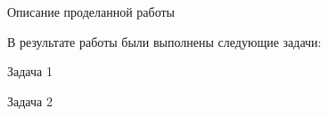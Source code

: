 \Conclusion %

Описание проделанной работы

В результате работы были выполнены следующие задачи:
\begin{compactlist}
  \item Задача 1
  \item Задача 2
\end{compactlist}

